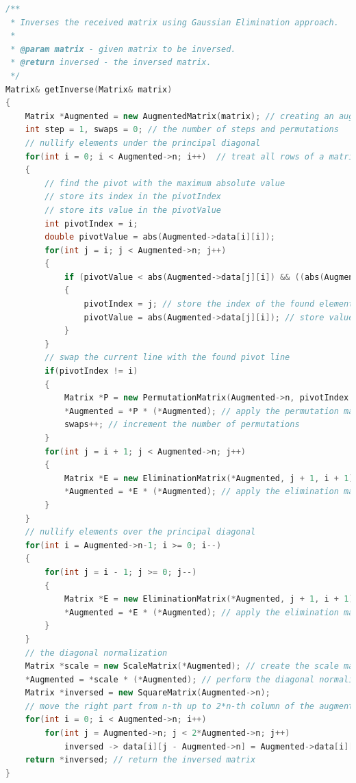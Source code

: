 \documentclass[11pt]{article}
\begin{document}
\begin{lstlisting}[language=C++, caption=Implementation of Predator-prey model]
/**
 * Inverses the received matrix using Gaussian Elimination approach.
 *
 * @param matrix - given matrix to be inversed.
 * @return inversed - the inversed matrix.
 */
Matrix& getInverse(Matrix& matrix)
{
    Matrix *Augmented = new AugmentedMatrix(matrix); // creating an augmented matrix
    int step = 1, swaps = 0; // the number of steps and permutations
    // nullify elements under the principal diagonal
    for(int i = 0; i < Augmented->n; i++)  // treat all rows of a matrix
    {
        // find the pivot with the maximum absolute value
        // store its index in the pivotIndex
        // store its value in the pivotValue
        int pivotIndex = i;
        double pivotValue = abs(Augmented->data[i][i]);
        for(int j = i; j < Augmented->n; j++)
        {
            if (pivotValue < abs(Augmented->data[j][i]) && ((abs(Augmented->data[j][i]) - pivotValue) >= 0.01)) // find the pivot with maximum absolute value
            {
                pivotIndex = j; // store the index of the found element
                pivotValue = abs(Augmented->data[j][i]); // store value of the found element
            }
        }
        // swap the current line with the found pivot line
        if(pivotIndex != i)
        {
            Matrix *P = new PermutationMatrix(Augmented->n, pivotIndex + 1, i + 1); // create the permutation matrix P_{pivotline+1 i+1} for a current state
            *Augmented = *P * (*Augmented); // apply the permutation matrix
            swaps++; // increment the number of permutations
        }
        for(int j = i + 1; j < Augmented->n; j++)
        {
            Matrix *E = new EliminationMatrix(*Augmented, j + 1, i + 1); // create the elimination matrix E_{j+1 i+1} for a current state
            *Augmented = *E * (*Augmented); // apply the elimination matrix
        }
    }
    // nullify elements over the principal diagonal
    for(int i = Augmented->n-1; i >= 0; i--)
    {
        for(int j = i - 1; j >= 0; j--)
        {
            Matrix *E = new EliminationMatrix(*Augmented, j + 1, i + 1); // create the elimination matrix E_{j+1 i+1} for a current state
            *Augmented = *E * (*Augmented); // apply the elimination matrix
        }
    }
    // the diagonal normalization
    Matrix *scale = new ScaleMatrix(*Augmented); // create the scale matrix for the diagonal normalization
    *Augmented = *scale * (*Augmented); // perform the diagonal normalization
    Matrix *inversed = new SquareMatrix(Augmented->n);
    // move the right part from n-th up to 2*n-th column of the augmented matrix to a created "inversed" matrix
    for(int i = 0; i < Augmented->n; i++)
        for(int j = Augmented->n; j < 2*Augmented->n; j++)
            inversed -> data[i][j - Augmented->n] = Augmented->data[i][j];
    return *inversed; // return the inversed matrix
}


\end{lstlisting}
\end{document}
